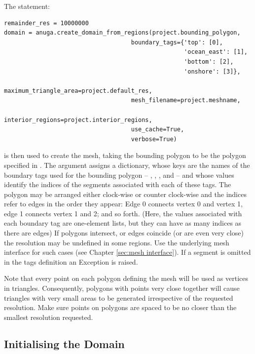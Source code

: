 \documentclass{manual}
\begin{document}
The statement:

\begin{verbatim}
remainder_res = 10000000
domain = anuga.create_domain_from_regions(project.bounding_polygon,
                                    boundary_tags={'top': [0],
                                                   'ocean_east': [1],
                                                   'bottom': [2],
                                                   'onshore': [3]},
                                    maximum_triangle_area=project.default_res,
                                    mesh_filename=project.meshname,
                                    interior_regions=project.interior_regions,
                                    use_cache=True,
                                    verbose=True)
\end{verbatim}

is then used to create the mesh, taking the bounding polygon to be
the polygon  specified in .
The argument  assigns a dictionary, whose keys
are the names of the boundary tags used for the bounding
polygon -- , , , and
 -- and whose values identify the indices of the
segments associated with each of these tags.
The polygon may be arranged either clock-wise or counter clock-wise and the
indices refer to edges in the order they appear: Edge 0 connects vertex 0 and vertex 1, edge 1 connects vertex 1 and 2; and so forth.
(Here, the values associated with each boundary tag are one-element lists, but they can have as many indices as there are edges)
If polygons intersect, or edges coincide (or are even very close) the resolution may be undefined in some regions.
Use the underlying mesh interface for such cases
(see Chapter \ref{sec:mesh interface}).
If a segment is omitted in the tags definition an Exception is raised.

Note that every point on each polygon defining the mesh will be used as vertices in triangles.
Consequently, polygons with points very close together will cause triangles with very small
areas to be generated irrespective of the requested resolution.
Make sure points on polygons are spaced to be no closer than the smallest resolution requested.

\subsection{Initialising the Domain}
\end{document}
